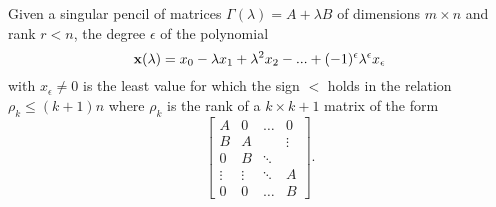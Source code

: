 \begin{theorem}
    Given a singular pencil of matrices \(\Gamma(\lambda) = A + \lambda B\) of dimensions \(m \times n\) and
    rank \(r < n\), the degree \(\epsilon\) of the polynomial
    \[
        \vb{x}(\lambda) = x_{0} - \lambda x_{1} + \lambda^2 x_{2} - ... + (-1)^{\epsilon} \lambda^\epsilon x_{\epsilon}
    \]
    with \(x_{\epsilon} \neq 0\) is the least value for which the sign \(<\) holds in
    the relation \(\rho_{k} \leq (k+1)n\) where \(\rho_{k}\) is the rank of a \(k \times k + 1\)
    matrix of the form
    \[
        \begin{bmatrix}
            A & 0 & \hdots &    0   \\
            B & A &        & \vdots \\
            0 & B & \ddots & \\
            \vdots & \vdots & \ddots & A \\
            0      &    0   & \hdots & B
        \end{bmatrix}.
    \]
\end{theorem}
